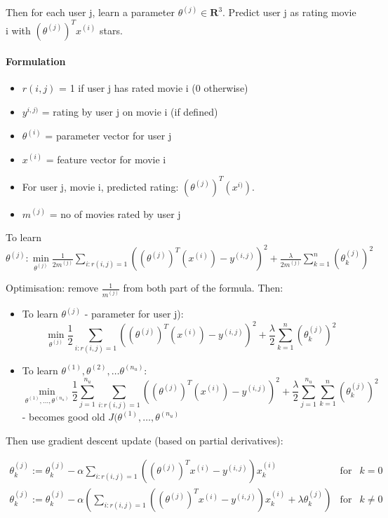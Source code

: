 \documentclass{scrartcl}
\begin{document}
Then for each user j, learn a parameter $\theta^{(j)} \in
\mathbf{R}^3$. Predict user j as rating movie i with $(\theta^{(j)})^T
x^{(i)}$ stars.

\paragraph{Formulation}

\begin{itemize}
\item $r(i, j)$ = 1 if user j has rated movie i (0 otherwise)
\item $y^{i, j)}$ = rating by user j on movie i (if defined)
\item $\theta^{(i)}$ = parameter vector for user j
\item $x^{(i)}$ = feature vector for movie i
\item For user j, movie i, predicted rating:
  $(\theta^{(j)})^T(x^{i)})$.
\item $m^{(j)}$ = no of movies rated by user j
\end{itemize}
To learn $\theta^{(j)}: 
 \min \limits_{\theta^{(j)}} \frac{1}{2 m^{(j)}} \sum
 \limits_{i:r(i,j)=1} \left( (\theta^{(j)})^T (x^{(i)}) - y^{(i, j)}
 \right)^2 + \frac{\lambda}{2 m^{(j)}} \sum \limits_{k = 1}^n (\theta_k^{(j)})^2 $

Optimisation: remove $\frac{1}{m^{(j)}}$ from both part of the
formula. Then:
\begin{itemize}
\item To learn $\theta^{(j)}$ - parameter for user j): \[ \min
  \limits_{\theta^{(j)}} \frac{1}{2} \sum \limits_{i:r(i,j)=1} \left(
    (\theta^{(j)})^T (x^{(i)}) - y^{(i, j)} \right)^2 +
  \frac{\lambda}{2} \sum \limits_{k = 1}^n (\theta_k^{(j)})^2 \]
\item To learn $\theta^{(1)}, \theta^{(2)}, \dots \theta^{(n_u)}$: \[
  \min \limits_{\theta^{(1)}, \dots, \theta^{(n_u)}} \frac{1}{2} \sum
  \limits_{j=1}^{n_u} \sum \limits_{i:r(i,j)=1} \left(
    (\theta^{(j)})^T (x^{(i)}) - y^{(i, j)} \right)^2 +
  \frac{\lambda}{2} \sum \limits_{j=1}^{n_u} \sum \limits_{k = 1}^n
  (\theta_k^{(j)})^2 \] - becomes good old $J(\theta^{(1)}, \dots,
  \theta^{(n_u)}$
\end{itemize}

Then use gradient descent update (based on partial derivatives):

\[ \begin{array}{lll} \theta_k^{(j)} := \theta_k^{(j)} - \alpha
  \sum\limits_{i:r(i,j)=1}
  ((\theta^{(j)})^Tx^{(i)} - y^{(i, j)})x_k^{(i)} & \mathrm{ for } & k = 0\\
  \theta_k^{(j)} := \theta_k^{(j)} - \alpha \left(
    \sum\limits_{i:r(i,j)=1} ((\theta^{(j)})^Tx^{(i)} - y^{(i,
      j)})x_k^{(i)} + \lambda \theta_k^{(j)} \right) & \mathrm{ for }
  & k \neq  0\\ 
\end{array} \]
\end{document}
